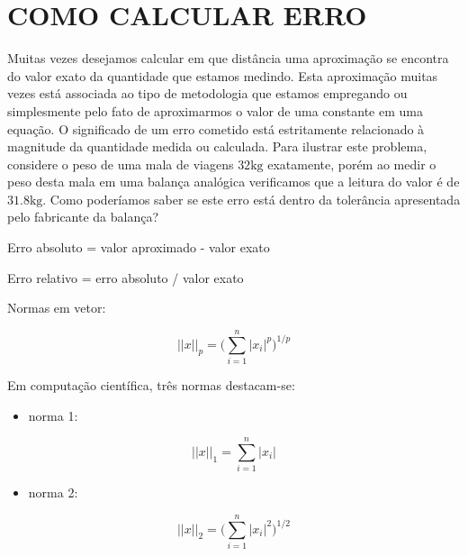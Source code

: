 \typeout{ ====================================================================}
\typeout{ ====================================================================}


\section{COMO CALCULAR ERRO}

Muitas vezes desejamos calcular em que distância uma aproximação se
encontra do valor exato da quantidade que estamos medindo. Esta
aproximação muitas vezes está associada ao tipo de metodologia que
estamos empregando ou simplesmente pelo fato de aproximarmos o valor de
uma constante em uma equação. O significado de um erro cometido está
estritamente relacionado à magnitude da quantidade medida ou calculada.
Para ilustrar este problema, considere o peso de uma mala de viagens $32
\text{kg}$ exatamente, porém ao medir o peso desta mala em uma balança
analógica verificamos que a leitura do valor é de $31.8 \text{kg}$. Como
poderíamos saber se este erro está dentro da tolerância apresentada pelo
fabricante da balança?

Erro absoluto = valor aproximado - valor exato

Erro relativo = erro absoluto / valor exato

Normas em vetor:

\begin{equation}
 ||x||_p = \bigg( \sum_{i=1}^{n} |x_i|^p \bigg)^{1/p}
\end{equation}

Em computação científica, três normas destacam-se:

\begin{itemize}
 \item norma 1:
\end{itemize}

\begin{equation}
 ||x||_1 = \sum_{i=1}^{n} |x_i|
\end{equation}

\begin{itemize}
 \item norma 2:
\end{itemize}

\begin{equation}
 ||x||_2 = \bigg( \sum_{i=1}^{n} |x_i|^2 \bigg)^{1/2}
\end{equation}

